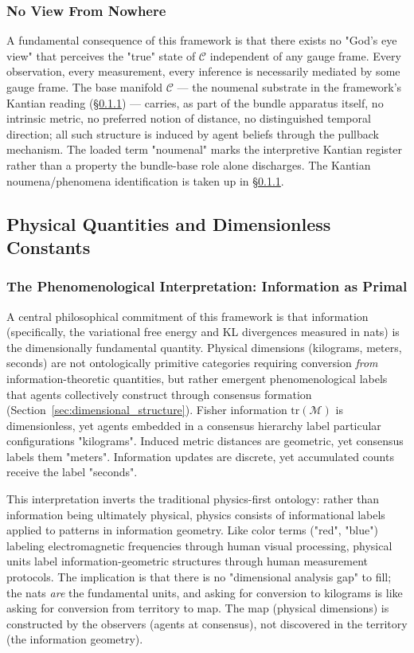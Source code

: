 \documentclass[11pt]{article}
\begin{document}
\subsubsection{No View From Nowhere}

A fundamental consequence of this framework is that there exists no "God's eye view" that perceives the "true" state of $\mathcal{C}$ independent of any gauge frame. Every observation, every measurement, every inference is necessarily mediated by some gauge frame. The base manifold $\mathcal{C}$ — the noumenal substrate in the framework's Kantian reading (§\ref{sec:phenomenological_interpretation}) — carries, as part of the bundle apparatus itself, no intrinsic metric, no preferred notion of distance, no distinguished temporal direction; all such structure is induced by agent beliefs through the pullback mechanism. The loaded term "noumenal" marks the interpretive Kantian register rather than a property the bundle-base role alone discharges. The Kantian noumena/phenomena identification is taken up in §\ref{sec:phenomenological_interpretation}.

\subsection{Physical Quantities and Dimensionless Constants}

\subsubsection{The Phenomenological Interpretation: Information as Primal}
\label{sec:phenomenological_interpretation}

A central philosophical commitment of this framework is that information (specifically, the variational free energy and KL divergences measured in nats) is the dimensionally fundamental quantity. Physical dimensions (kilograms, meters, seconds) are not ontologically primitive categories requiring conversion \emph{from} information-theoretic quantities, but rather emergent phenomenological labels that agents collectively construct through consensus formation (Section~\ref{sec:dimensional_structure}). Fisher information $\mathrm{tr}(\mathcal{M})$ is dimensionless, yet agents embedded in a consensus hierarchy label particular configurations "kilograms". Induced metric distances are geometric, yet consensus labels them "meters". Information updates are discrete, yet accumulated counts receive the label "seconds".

This interpretation inverts the traditional physics-first ontology: rather than information being ultimately physical, physics consists of informational labels applied to patterns in information geometry. Like color terms ("red", "blue") labeling electromagnetic frequencies through human visual processing, physical units label information-geometric structures through human measurement protocols. The implication is that there is no "dimensional analysis gap" to fill; the nats \emph{are} the fundamental units, and asking for conversion to kilograms is like asking for conversion from territory to map. The map (physical dimensions) is constructed by the observers (agents at consensus), not discovered in the territory (the information geometry).
\end{document}
